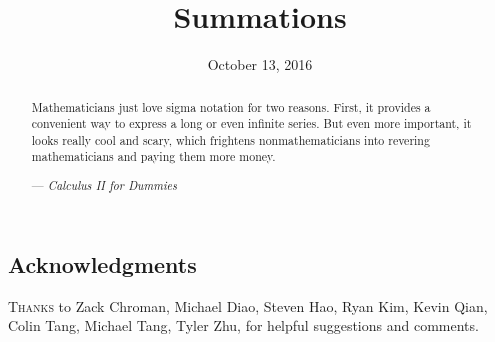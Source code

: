 \documentclass[11pt]{scrartcl}
\begin{document}
\title{Summations}
\date{October 13, 2016}
\maketitle

\begin{abstract}
	\sffamily\small
	Mathematicians just love sigma notation for two reasons.
	First, it provides a convenient way to express a long or even infinite series.
	But even more important, it looks really cool and scary,
	which frightens nonmathematicians into revering mathematicians
	and paying them more money.

	\medskip
	
	--- \emph{Calculus II for Dummies} %
\end{abstract}
\subsection*{Acknowledgments}
\textsc{Thanks} to Zack Chroman, Michael Diao,
Steven Hao, Ryan Kim, Kevin Qian, Colin Tang, Michael Tang, Tyler Zhu,
for helpful suggestions and comments.

\tableofcontents
\eject
\end{document}
